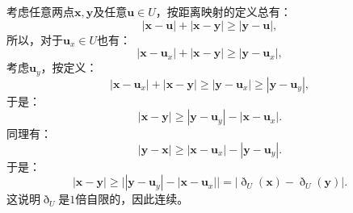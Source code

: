 \documentclass[12pt,UTF8]{ctexbook}
\begin{document}
\begin{so}
    考虑任意两点$\mathbf{x}, \mathbf{y}$及任意$\mathbf{u}\in U$，按距离映射的定义总有：
    $$ |\mathbf{x} - \mathbf{u}| + |\mathbf{x} - \mathbf{y}| \geqslant |\mathbf{y} - \mathbf{u}|,$$
    所以，对于$\mathbf{u}_x \in U$也有：
    $$ |\mathbf{x} - \mathbf{u}_x| + |\mathbf{x} - \mathbf{y}| \geqslant |\mathbf{y} - \mathbf{u}_x|,$$
    考虑$\mathbf{u}_y$，按定义：
    $$ |\mathbf{x} - \mathbf{u}_x| + |\mathbf{x} - \mathbf{y}| \geqslant |\mathbf{y} - \mathbf{u}_x| \geqslant |\mathbf{y} - \mathbf{u}_y|,$$
    于是：
    $$ |\mathbf{x} - \mathbf{y}| \geqslant |\mathbf{y} - \mathbf{u}_y| - |\mathbf{x} - \mathbf{u}_x|. $$
    同理有：
    $$ |\mathbf{y} - \mathbf{x}| \geqslant |\mathbf{x} - \mathbf{u}_x| - |\mathbf{y} - \mathbf{u}_y|. $$
    于是：
    $$ |\mathbf{x} - \mathbf{y}| \geqslant \big||\mathbf{y} - \mathbf{u}_y| - |\mathbf{x} - \mathbf{u}_x|\big| = \left|\eth_{U}(\mathbf{x}) - \eth_{U}(\mathbf{y})\right|. $$
    这说明$\eth_{U}$是$1$倍自限的，因此连续。

\end{so}

\begin{sk}
    
\end{sk}
\end{document}
